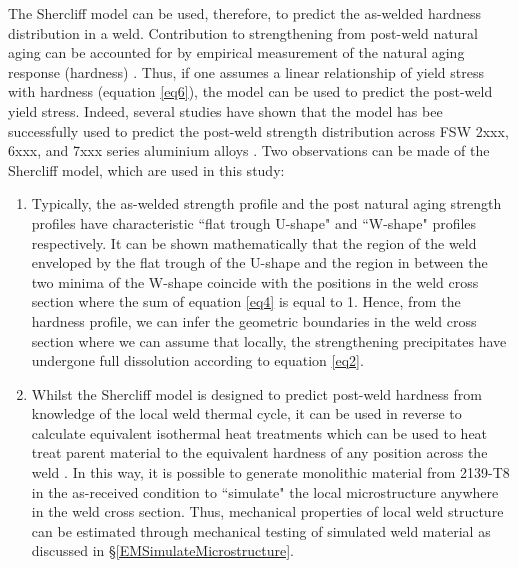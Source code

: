 	The Shercliff model can be used, therefore, to predict the as-welded hardness distribution in a weld. Contribution to strengthening from post-weld natural aging can be accounted for by empirical measurement of the natural aging response (hardness) \cite{Robson2006a}. Thus, if one assumes a linear relationship of yield stress with hardness (equation \ref{eq6}), the model can be used to predict the post-weld yield stress. Indeed, several studies have shown that the model has bee successfully used to predict the post-weld strength distribution across FSW 2xxx, 6xxx, and 7xxx series aluminium alloys \cite{Shercliff2005,Robson2006}. Two observations can be made of the Shercliff model, which are used in this study:
	\begin{enumerate}
		\item Typically, the as-welded strength profile and the post natural aging strength profiles have characteristic ``flat trough U-shape" and ``W-shape" profiles respectively. It can be shown mathematically that the region of the weld enveloped by the flat trough of the U-shape and the region in between the two minima of the W-shape coincide with the positions in the weld cross section where the sum of equation \ref{eq4} is equal to 1. Hence, from the hardness profile, we can infer the geometric boundaries in the weld cross section where we can assume that locally, the strengthening precipitates have undergone full dissolution according to equation \ref{eq2}. %
		
		\item Whilst the Shercliff model is designed to predict post-weld hardness from knowledge of the local weld thermal cycle, it can be used in reverse to calculate equivalent isothermal heat treatments which can be used to heat treat parent material to the equivalent hardness of any position across the weld \cite{Shercliff2005,Sullivan2011}. In this way, it is possible to generate monolithic material from 2139-T8 in the as-received condition to ``simulate" the local microstructure anywhere in the weld cross section. Thus, mechanical properties of local weld structure can be estimated through mechanical testing of simulated weld material as discussed in \S\ref{EMSimulateMicrostructure}. 
	\end{enumerate}
	

